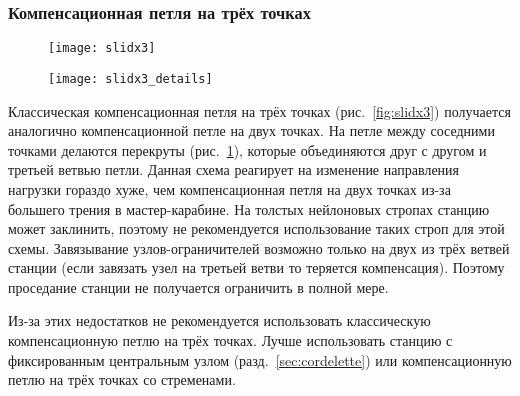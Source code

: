 \documentclass[fleqn, 12pt]{extarticle}
\begin{document}
    \subsubsection{Компенсационная петля на трёх точках}
    \begin{figure}[h]
        \centering
        \begin{minipage}[t]{0.45\textwidth}
            \texttt{[image: slidx3]}
            \label{fig:slidx3}
        \end{minipage}\hspace{0.05\textwidth}
        \begin{minipage}[t]{0.45\textwidth}
            \texttt{[image: slidx3\_details]}
            \label{fig:slidx3_details}
        \end{minipage} 
    \end{figure}
    Классическая компенсационная петля на трёх точках (рис.~\ref{fig:slidx3}) получается аналогично компенсационной петле на двух точках.
    На петле между соседними точками делаются перекруты (рис.~\ref{fig:slidx3_details}),
    которые объединяются друг с другом и третьей ветвью петли. Данная схема реагирует на изменение направления нагрузки гораздо хуже, чем компенсационная петля на двух точках
    из-за большего трения в мастер-карабине. На толстых нейлоновых стропах станцию может заклинить, поэтому не рекомендуется использование таких строп для этой схемы.
    Завязывание узлов-ограничителей возможно только на двух из трёх ветвей станции (если завязать узел на третьей ветви то теряется компенсация). Поэтому проседание станции
    не получается ограничить в полной мере.
    
    Из-за этих недостатков не рекомендуется использовать классическую компенсационную петлю на трёх точках. Лучше использовать станцию с фиксированным центральным узлом
    (разд.~\ref{sec:cordelette}) или компенсационную петлю на трёх точках со стременами.
    
\end{document}
